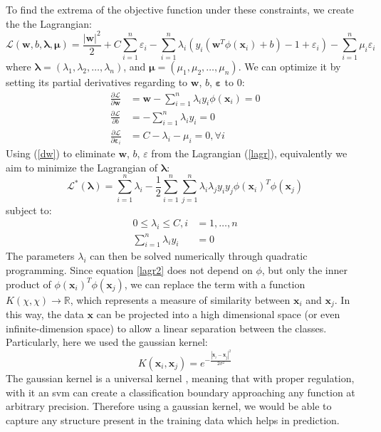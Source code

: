 To find the extrema of the objective function under these constraints, we create the the Lagrangian:
\begin{equation} \label{lagr}
    \mathcal{L}(\mathbf{w}, b, \mathbf{\lambda}, \mathbf{\mu})=\frac{|\mathbf{w}|^2}{2} + C\sum_{i=1}^n\varepsilon_i - \sum_{i=1}^n \lambda_i(y_i(\mathbf{w}^T\phi(\mathbf{x}_i) + b) - 1 + \varepsilon_i) - \sum_{i=1}^n \mu_i\varepsilon_i
\end{equation}
where $\mathbf{\lambda}=(\lambda_1, \lambda_2, \ldots, \lambda_n)$, and $\mathbf{\mu}=(\mu_1, \mu_2, \ldots, \mu_n)$. We can optimize it by setting its partial derivatives regarding to $\mathbf{w}$, $b$, $\mathbf{\varepsilon}$ to 0:
\begin{align}\label{dw}
    \frac{\partial\mathcal{L}}{\partial\mathbf{w}} &= \mathbf{w} - \sum_{i=1}^n \lambda_i  y_i  \phi(\mathbf{x}_i) = 0 \nonumber\\ 
    \frac{\partial\mathcal{L}}{\partial{b}} &= - \sum_{i=1}^n \lambda_i y_i = 0 \\
    \frac{\partial\mathcal{L}}{\partial{\mathbf{\varepsilon}_i}} &= C - \lambda_i - \mu_i = 0, \forall i  \nonumber 
\end{align}
Using (\ref{dw}) to eliminate $\mathbf{w}$, $b$, $\varepsilon$ from the Lagrangian (\ref{lagr}), equivalently we aim to minimize the Lagrangian of $\mathbf{\lambda}$:
\begin{equation} \label{lagr2}
    \mathcal{L}^*(\mathbf{\lambda}) = \sum_{i=1}^{n} \lambda_i - \frac{1}{2}\sum_{i=1}^n \sum_{j=1}^n \lambda_i \lambda_j y_i y_j \phi(\mathbf{x}_i)^T\phi(\mathbf{x}_j)
\end{equation}
subject to:
\begin{align*}
    0 \leq \lambda_i \leq C, i &= 1,\ldots,n \\
    \sum_{i=1}^n \lambda_i y_i &= 0
\end{align*}
The parameters $\lambda_i$ can then be solved numerically through quadratic programming. Since equation \ref{lagr2} does not depend on $\phi$, but only the inner product of $\phi(\mathbf{x}_i)^T\phi(\mathbf{x}_j)$, we can replace the term with a function $K(\chi, \chi) \to \mathbb{R}$, which represents a measure of similarity between $\mathbf{x}_i$ and $ \mathbf{x}_j$. In this way, the data $\mathbf{x}$ can be projected into a high dimensional space (or even infinite-dimension space) to allow a linear separation between the classes. Particularly, here we used the gaussian kernel:
\begin{equation*}
    K(\mathbf{x}_i, \mathbf{x}_j) = e^{-\frac{|\mathbf{x}_i - \mathbf{x}_j|^2}{2\sigma^2}}
\end{equation*}
The gaussian kernel is a universal kernel , meaning that with proper regulation, with it an \gls{svm} can create a classification boundary approaching any function at arbitrary precision. Therefore using a gaussian kernel, we would be able to capture any structure present in the training data which helps in prediction.

